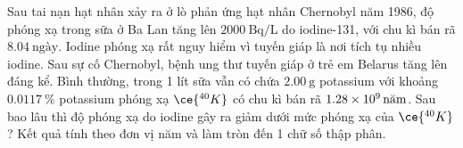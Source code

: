 \begin{ex}
\begin{center}
	\end{center}
\end{ex}
\begin{ex}
	Sau tai nạn hạt nhân xảy ra ở lò phản ứng hạt nhân Chernobyl năm 1986, độ phóng xạ trong sữa ở Ba Lan tăng lên $\SI{2000}{\becquerel/\liter}$ do iodine-131, với chu kì bán rã $\SI{8.04}{\text{ngày}}$. Iodine phóng xạ rất nguy hiểm vì tuyến giáp là nơi tích tụ nhiều iodine. Sau sự cố Chernobyl, bệnh ung thư tuyến giáp ở trẻ em Belarus tăng lên đáng kể. Bình thường, trong 1 lít sữa vẫn có chứa $\SI{2.00}{\gram}$ potassium với khoảng $\SI{0.0117}{\percent}$ potassium phóng xạ $\ce{^{40}K}$ có chu kì bán rã $\SI{1.28E9}{\text{năm}}$. Sau bao lâu thì độ phóng xạ do iodine gây ra giảm dưới mức phóng xạ của $\ce{^{40}K}$? Kết quả tính theo đơn vị năm và làm tròn đến 1 chữ số thập phân.
\end{ex}
